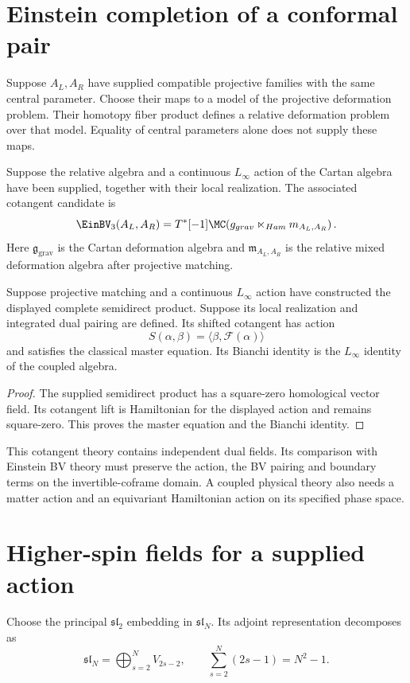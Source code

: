 \chapter{Einstein completion of a conformal pair}
Suppose $A_L,A_R$ have supplied compatible projective families
with the same central parameter.
Choose their maps to a model of the projective deformation problem.
Their homotopy fiber product defines a relative deformation
problem over that model.
Equality of central parameters alone does not supply these maps.

\begin{definition}
Suppose the relative algebra and a continuous $L_\infty$ action
of the Cartan algebra have been supplied, together with their
local realization.
The associated cotangent candidate is
\[
 \EinBV_3(A_L,A_R)
 =T^*[-1]\MC\!\left(
   \mathfrak g_{\mathrm{grav}}\ltimes_{\mathrm{Ham}}
   \mathfrak m_{A_L,A_R}\right).
\]
Here $\mathfrak g_{\mathrm{grav}}$ is the Cartan deformation
algebra and $\mathfrak m_{A_L,A_R}$ is the relative mixed
deformation algebra after projective matching.
\end{definition}

\begin{theorem}
Suppose projective matching and a continuous $L_\infty$ action
have constructed the displayed complete semidirect product.
Suppose its local realization and integrated dual pairing are defined.
Its shifted cotangent has action
\[
 S(\alpha,\beta)=\langle\beta,\mathcal F(\alpha)\rangle
\]
and satisfies the classical master equation.
Its Bianchi identity is the $L_\infty$ identity of the coupled algebra.
\end{theorem}
\begin{proof}
The supplied semidirect product has a square-zero homological
vector field.
Its cotangent lift is Hamiltonian for the displayed action and
remains square-zero.
This proves the master equation and the Bianchi identity.
\end{proof}

This cotangent theory contains independent dual fields.
Its comparison with Einstein BV theory must preserve the action,
the BV pairing and boundary terms on the invertible-coframe domain.
A coupled physical theory also needs a matter action and an
equivariant Hamiltonian action on its specified phase space.

\chapter{Higher-spin fields for a supplied action}
Choose the principal $\mathfrak{sl}_2$ embedding in
$\mathfrak{sl}_N$.
Its adjoint representation decomposes as
\[
 \mathfrak{sl}_N=\bigoplus_{s=2}^N V_{2s-2},
 \qquad \sum_{s=2}^N(2s-1)=N^2-1.
\]

